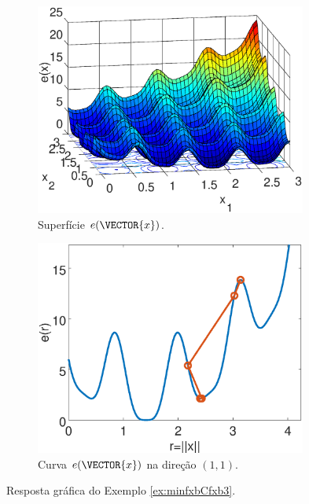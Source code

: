 \begin{figure}[h!]
     \centering
     \begin{subfigure}[b]{0.49\textwidth}
         \centering
         \includegraphics[width=0.98\textwidth]{chapters/minimization-fx/mfiles/fx3/surfcfx3.eps}
         \caption{Superfície $e(\VECTOR{x})$. }
         \label{fig:ex:minfxbCfxb3:a}
     \end{subfigure}
     \hfill
     \begin{subfigure}[b]{0.49\textwidth}
         \centering
         \includegraphics[width=0.98\textwidth]{chapters/minimization-fx/mfiles/fx3/plotfx3.eps}
         \caption{Curva $e(\VECTOR{x})$ na direção $(1,1)$.}
         \label{fig:ex:minfxbCfxb3:b}
     \end{subfigure}
        \caption{Resposta gráfica do Exemplo \ref{ex:minfxbCfxb3}. }
        \label{fig:ex:minfxbCfxb3}
\end{figure}

